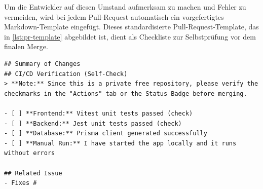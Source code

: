 Um die Entwickler auf diesen Umstand aufmerksam zu machen und Fehler zu vermeiden, wird bei jedem Pull-Request automatisch ein vorgefertigtes Markdown-Template eingefügt. Dieses standardisierte Pull-Request-Template, das in \autoref{lst:pr-template} abgebildet ist, dient als Checkliste zur Selbstprüfung vor dem finalen Merge.

\begin{listing}[H]
    \begin{verbatim}
## Summary of Changes
## CI/CD Verification (Self-Check)
> **Note:** Since this is a private free repository, please verify the checkmarks in the "Actions" tab or the Status Badge before merging.

- [ ] **Frontend:** Vitest unit tests passed (check)
- [ ] **Backend:** Jest unit tests passed (check)
- [ ] **Database:** Prisma client generated successfully 
- [ ] **Manual Run:** I have started the app locally and it runs without errors

## Related Issue
- Fixes #
    \end{verbatim}
    \caption{GitHub-Pull-Request-Template für standardisierte Code-Reviews}
    \label{lst:pr-template}
\end{listing}